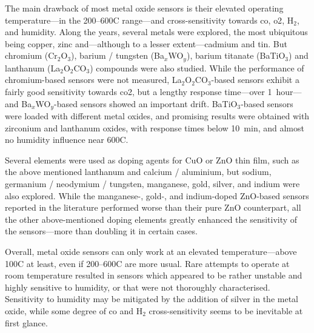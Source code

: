 The main drawback of most metal oxide sensors is their elevated operating temperature---in the 200--600{\degree}C range---and cross-sensitivity towards \gls{co}, \gls{o2}, H$_2$, and humidity. Along the years, several metals were explored, the most ubiquitous being copper, zinc and---although to a lesser extent---cadmium and tin. But chromium (Cr$_2$O$_3$)\cite{seiferth1999}, barium / tungsten (Ba$_x$WO$_y$)\cite{cavanagh2011}, barium titanate (BaTiO$_3$)\cite{haeusler1996} and lanthanum (La$_2$O$_2$CO$_3$)\cite{chen2014} compounds were also studied. While the performance of chromium-based sensors were not measured, La$_2$O$_2$CO$_3$-based sensors exhibit a fairly good sensitivity towards \gls{co2}, but a lengthy response time---over 1~hour---and Ba$_x$WO$_y$-based sensors showed an important drift. BaTiO$_3$-based sensors were loaded with different metal oxides, and promising results were obtained with zirconium and lanthanum oxides, with response times below 10~min, and almost no humidity influence near 600{\degree}C\cite{haeusler1996}.

Several elements were used as doping agents for CuO or ZnO thin film, such as the above mentioned lanthanum and calcium / aluminium, but sodium\cite{basyooni2017}, germanium / neodymium / tungsten\cite{colak2019}, manganese\cite{ghanbarishohany2018}, gold\cite{alvarez2020}, silver\cite{ishihara1993, herran2009}, and indium\cite{shokryhassan2014} were also explored. While the manganese-, gold-, and indium-doped ZnO-based sensors reported in the literature performed worse than their pure ZnO counterpart, all the other above-mentioned doping elements greatly enhanced the sensitivity of the sensors---more than doubling it in certain cases\cite{ghosh2019}.

Overall, metal oxide sensors can only work at an elevated temperature---above 100{\degree}C at least, even if 200--600{\degree}C are more usual. Rare attempts to operate at room temperature resulted in sensors which appeared to be rather unstable and highly sensitive to humidity\cite{tanvir2015a, tanvir2015b}, or that were not thoroughly characterised\cite{basyooni2017, alvarez2020}. Sensitivity to humidity may be mitigated by the addition of silver in the metal oxide\cite{haeusler1996, ishihara1995}, while some degree of \gls{co} and H$_2$ cross-sensitivity seems to be inevitable at first glance.

